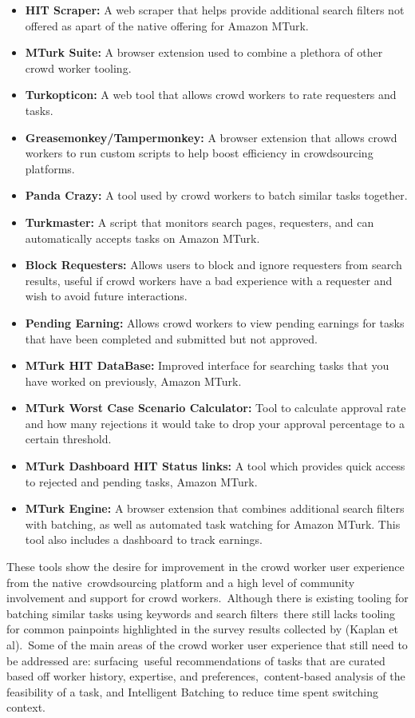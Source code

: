 \documentclass[letterpaper,12pt]{article}
\begin{document}
\begin{itemize}
	\item \textbf{HIT Scraper:} A web scraper that helps provide additional search filters not offered as apart of the native offering for Amazon MTurk.
	\item \textbf{MTurk Suite:} A browser extension used to combine a plethora of other crowd worker tooling.
	\item \textbf{Turkopticon:} A web tool that allows crowd workers to rate requesters and tasks.
	\item \textbf{Greasemonkey/Tampermonkey:} A browser extension that allows crowd workers to run custom scripts to help boost efficiency in crowdsourcing platforms.
	\item \textbf{Panda Crazy:} A tool used by crowd workers to batch similar tasks together.
	\item \textbf{Turkmaster:} A script that monitors search pages, requesters, and can automatically accepts tasks on Amazon MTurk.
	\item \textbf{Block Requesters:} Allows users to block and ignore requesters from search results, useful if crowd workers have a bad experience with a requester and wish to avoid future interactions.
	\item \textbf{Pending Earning:} Allows crowd workers to view pending earnings for tasks that have been completed and submitted but not approved.
	\item \textbf{MTurk HIT DataBase:} Improved interface for searching tasks that you have worked on previously, Amazon MTurk.
	\item \textbf{MTurk Worst Case Scenario Calculator:} Tool to calculate approval rate and how many rejections it would take to drop your approval percentage to a certain threshold.
	\item \textbf{MTurk Dashboard HIT Status links:} A tool which provides quick access to rejected and pending tasks, Amazon MTurk.
	\item \textbf{MTurk Engine:} A browser extension that combines additional search filters with batching, as well as automated task watching for Amazon MTurk. This tool also includes a dashboard to track earnings.
\end{itemize}

These tools show the desire for improvement in the crowd worker user experience from the native\
crowdsourcing platform and a high level of community involvement and support for crowd workers.\
Although there is existing tooling for batching similar tasks using keywords and search filters\
there still lacks tooling for common painpoints highlighted in the survey results collected by (Kaplan et al).\
Some of the main areas of the crowd worker user experience that still need to be addressed are: surfacing\
useful recommendations of tasks that are curated based off worker history, expertise, and preferences,\
content-based analysis of the feasibility of a task, and Intelligent Batching to reduce time spent switching
context.
\end{document}

